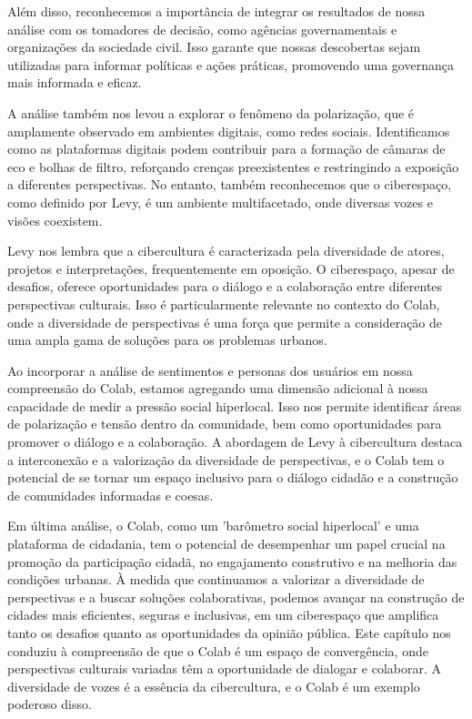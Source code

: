 Além disso, reconhecemos a importância de integrar os resultados de nossa análise com os tomadores de decisão, como agências governamentais e organizações da sociedade civil. Isso garante que nossas descobertas sejam utilizadas para informar políticas e ações práticas, promovendo uma governança mais informada e eficaz.

A análise também nos levou a explorar o fenômeno da polarização, que é amplamente observado em ambientes digitais, como redes sociais. Identificamos como as plataformas digitais podem contribuir para a formação de câmaras de eco e bolhas de filtro, reforçando crenças preexistentes e restringindo a exposição a diferentes perspectivas. No entanto, também reconhecemos que o ciberespaço, como definido por Levy, é um ambiente multifacetado, onde diversas vozes e visões coexistem.

Levy nos lembra que a cibercultura é caracterizada pela diversidade de atores, projetos e interpretações, frequentemente em oposição. O ciberespaço, apesar de desafios, oferece oportunidades para o diálogo e a colaboração entre diferentes perspectivas culturais. Isso é particularmente relevante no contexto do Colab, onde a diversidade de perspectivas é uma força que permite a consideração de uma ampla gama de soluções para os problemas urbanos.

Ao incorporar a análise de sentimentos e personas dos usuários em nossa compreensão do Colab, estamos agregando uma dimensão adicional à nossa capacidade de medir a pressão social hiperlocal. Isso nos permite identificar áreas de polarização e tensão dentro da comunidade, bem como oportunidades para promover o diálogo e a colaboração. A abordagem de Levy à cibercultura destaca a interconexão e a valorização da diversidade de perspectivas, e o Colab tem o potencial de se tornar um espaço inclusivo para o diálogo cidadão e a construção de comunidades informadas e coesas.

Em última análise, o Colab, como um 'barômetro social hiperlocal' e uma plataforma de cidadania, tem o potencial de desempenhar um papel crucial na promoção da participação cidadã, no engajamento construtivo e na melhoria das condições urbanas. À medida que continuamos a valorizar a diversidade de perspectivas e a buscar soluções colaborativas, podemos avançar na construção de cidades mais eficientes, seguras e inclusivas, em um ciberespaço que amplifica tanto os desafios quanto as oportunidades da opinião pública. Este capítulo nos conduziu à compreensão de que o Colab é um espaço de convergência, onde perspectivas culturais variadas têm a oportunidade de dialogar e colaborar. A diversidade de vozes é a essência da cibercultura, e o Colab é um exemplo poderoso disso.


